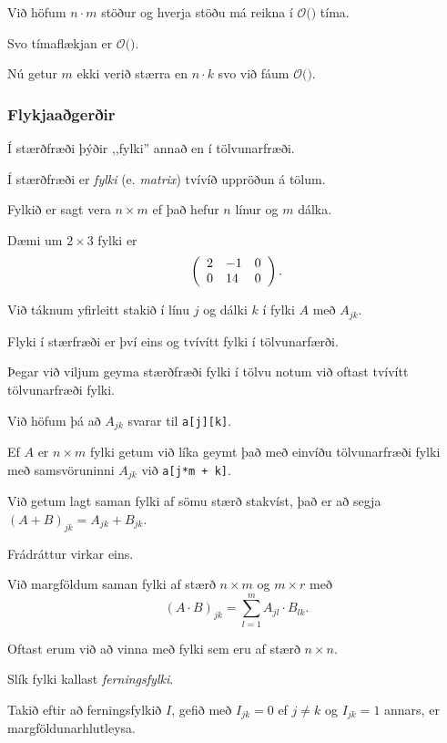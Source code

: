 {
}

{
	{
		\item<1-> Við höfum $n \cdot m$ stöður og hverja stöðu má reikna í $\mathcal{O}($$)$ tíma.
		\item<3-> Svo tímaflækjan er $\mathcal{O}($\onslide<4->{$n \cdot m \cdot k$}$)$.
		\item<5-> Nú getur $m$ ekki verið stærra en $n \cdot k$ svo við fáum $\mathcal{O}($\onslide<6->{$n^2 \cdot k^2$}$)$.
	}
}


{
	\frametitle{Flykjaaðgerðir}
	{
		\item<1-> Í stærðfræði þýðir ,,fylki'' annað en í tölvunarfræði.
		\item<2-> Í stærðfræði er \emph{fylki} (e. \emph{matrix}) tvívíð uppröðun á tölum.
		\item<3-> Fylkið er sagt vera $n \times m$ ef það hefur $n$ línur og $m$ dálka.
		\item<4-> Dæmi um $2 \times 3$ fylki er
		\[
			\left (
			\env{array}
			{ {l l l}
				2 & -1 & 0\\
				0 & 14 & 0
			}
			\right ).
		\]
		\item<5-> Við táknum yfirleitt stakið í línu $j$ og dálki $k$ í fylki $A$ með $A_{jk}$.
		\item<6-> Flyki í stærfræði er því eins og tvívítt fylki í tölvunarfærði.
	}
}

{
	{
		\item<1-> Þegar við viljum geyma stærðfræði fylki í tölvu notum við oftast tvívítt tölvunarfræði fylki.
		\item<2-> Við höfum þá að $A_{jk}$ svarar til \texttt{a[j][k]}.
		\item<3-> Ef $A$ er $n \times m$ fylki getum við líka geymt það með einvíðu tölvunarfræði fylki með samsvöruninni $A_{jk}$ við
					\texttt{a[j*m + k]}.
	}
}

{
	{
		\item<1-> Við getum lagt saman fylki af sömu stærð stakvíst, það er að segja $(A + B)_{jk} = A_{jk} + B_{jk}$.
		\item<2-> Frádráttur virkar eins.
		\item<3-> Við margföldum saman fylki af stærð $n \times m$ og $m \times r$ með
		\[
			(A \cdot B)_{jk} = \sum_{l = 1}^m A_{jl} \cdot B_{lk}.
		\]
		\item<4-> Oftast erum við að vinna með fylki sem eru af stærð $n \times n$.
		\item<5-> Slík fylki kallast \emph{ferningsfylki}.
		\item<6-> Takið eftir að ferningsfylkið $I$, gefið með $I_{jk} = 0$ ef $j \neq k$ og $I_{jk} = 1$ annars, er margföldunarhlutleysa.
	}
}

